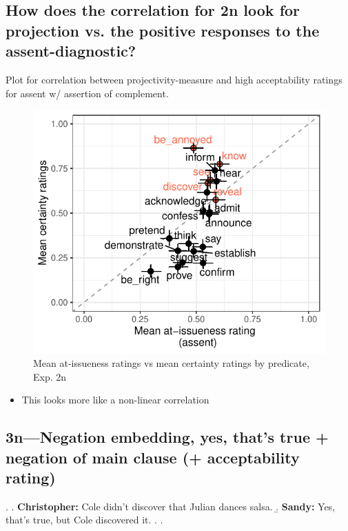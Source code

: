\documentclass[11pt]{article}
\begin{document}
	\subsection{How does the correlation for 2n look for projection vs. the positive responses to the assent-diagnostic?} %
		Plot for correlation between projectivity-measure and high acceptability ratings for assent w/ assertion of complement.

			\begin{figure}[h]
				\centering
				\includegraphics[]{figures/n2-inv-correl.pdf}
				\caption{Mean at-issueness ratings vs mean certainty ratings by predicate, Exp. 2n}
				\label{fig:figure4}
			\end{figure}


		\begin{itemize}
			\item This looks more like a non-linear correlation
		\end{itemize}

	\subsection{3n---Negation embedding, yes, that's true + negation of main clause (+ acceptability rating)} %
		\ex. \a. \textbf{Christopher:} Cole didn’t discover that Julian dances salsa.
				\b. \textbf{Sandy:} Yes, that’s true, but Cole discovered it.
				\z.
			\z.
\end{document}
